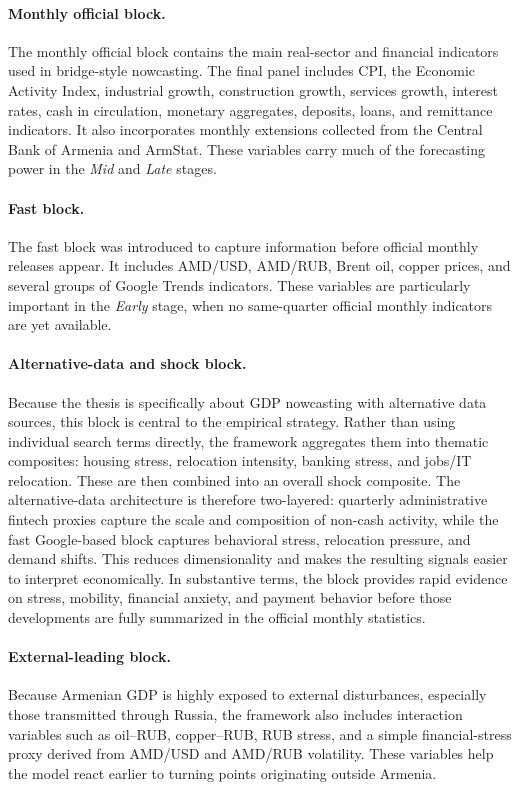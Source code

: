 \documentclass[12pt,a4paper]{article}
\begin{document}
\paragraph{Monthly official block.}
The monthly official block contains the main real-sector and financial indicators used in bridge-style nowcasting. The final panel includes CPI, the Economic Activity Index, industrial growth, construction growth, services growth, interest rates, cash in circulation, monetary aggregates, deposits, loans, and remittance indicators. It also incorporates monthly extensions collected from the Central Bank of Armenia and ArmStat. These variables carry much of the forecasting power in the \textit{Mid} and \textit{Late} stages.

\paragraph{Fast block.}
The fast block was introduced to capture information before official monthly releases appear. It includes AMD/USD, AMD/RUB, Brent oil, copper prices, and several groups of Google Trends indicators. These variables are particularly important in the \textit{Early} stage, when no same-quarter official monthly indicators are yet available.

\paragraph{Alternative-data and shock block.}
Because the thesis is specifically about GDP nowcasting with alternative data sources, this block is central to the empirical strategy. Rather than using individual search terms directly, the framework aggregates them into thematic composites: housing stress, relocation intensity, banking stress, and jobs/IT relocation. These are then combined into an overall shock composite. The alternative-data architecture is therefore two-layered: quarterly administrative fintech proxies capture the scale and composition of non-cash activity, while the fast Google-based block captures behavioral stress, relocation pressure, and demand shifts. This reduces dimensionality and makes the resulting signals easier to interpret economically. In substantive terms, the block provides rapid evidence on stress, mobility, financial anxiety, and payment behavior before those developments are fully summarized in the official monthly statistics.

\paragraph{External-leading block.}
Because Armenian GDP is highly exposed to external disturbances, especially those transmitted through Russia, the framework also includes interaction variables such as oil--RUB, copper--RUB, RUB stress, and a simple financial-stress proxy derived from AMD/USD and AMD/RUB volatility. These variables help the model react earlier to turning points originating outside Armenia.
\end{document}
